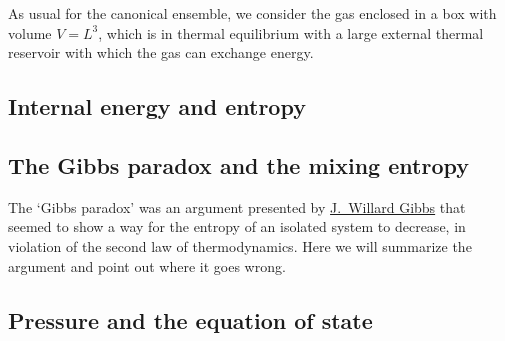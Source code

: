 As usual for the canonical ensemble, we consider the gas enclosed in a box with volume $V = L^3$, which is in thermal equilibrium with a large external thermal reservoir with which the gas can exchange energy.






\newpage %
\subsection{Internal energy and entropy}



\newpage %
\subsection{The Gibbs paradox and the mixing entropy}
The `Gibbs paradox' was an argument presented by \href{https://en.wikipedia.org/wiki/Josiah_Willard_Gibbs}{J.\ Willard Gibbs}  that seemed to show a way for the entropy of an isolated system to decrease, in violation of the second law of thermodynamics.
Here we will summarize the argument and point out where it goes wrong.




\newpage %
\subsection{Pressure and the equation of state}
